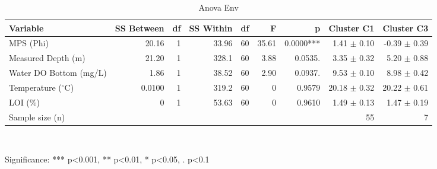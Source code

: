 \begin{table}[htbp]
  \centering
  \caption{Anova Env}
  \label{tab:02_taxa_assemblage_reproduction_with_same_taxa_data_anova_env}
  \small
  \begin{tabular}{lrrrrrrrr}
    \toprule
    Variable & SS Between & df & SS Within & df  & F & p & Cluster C1 & Cluster C3 \\
    \midrule
    MPS (Phi) & 20.16 & 1 & 33.96 & 60 & 35.61 & 0.0000*** & 1.41 $\pm$ 0.10 & -0.39 $\pm$ 0.39 \\
    Measured Depth (m) & 21.20 & 1 & 328.1 & 60 & 3.88 & 0.0535. & 3.35 $\pm$ 0.32 & 5.20 $\pm$ 0.88 \\
    Water DO Bottom (mg/L) & 1.86 & 1 & 38.52 & 60 & 2.90 & 0.0937. & 9.53 $\pm$ 0.10 & 8.98 $\pm$ 0.42 \\
    Temperature ($^{\circ}$C) & 0.0100 & 1 & 319.2 & 60 & 0 & 0.9579 & 20.18 $\pm$ 0.32 & 20.22 $\pm$ 0.61 \\
    LOI (\%) & 0 & 1 & 53.63 & 60 & 0 & 0.9610 & 1.49 $\pm$ 0.13 & 1.47 $\pm$ 0.19 \\
    Sample size (n) &  &  &  &  &  &  & 55 & 7 \\
    \bottomrule
  \end{tabular}
  \\[4pt]
  \parbox{\textwidth}{\footnotesize Significance: *** p<0.001, ** p<0.01, * p<0.05, . p<0.1}
\end{table}
